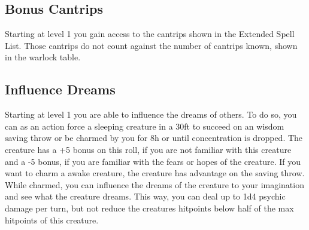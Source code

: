 \documentclass[a4paper,10pt,twoside,twocolumn]{dndbook} %
\begin{document}
	\subsection{Bonus Cantrips}
	Starting at level 1 you gain access to the cantrips shown in the Extended Spell List. Those cantrips do not count against the number of cantrips known, shown in the warlock table.
	\subsection{Influence Dreams}
	Starting at level 1 you are able to influence the dreams of others. To do so, you can as an action force a sleeping creature in a 30ft to succeed on an wisdom saving throw or be charmed by you for 8h or until concentration is dropped.
	The creature has a +5 bonus on this roll, if you are not familiar with this creature and a -5 bonus, if you are familiar with the fears or hopes of the creature. If you want to charm a awake creature, the creature has advantage on the saving throw.
	While charmed, you can influence the dreams of the creature to your imagination and see what the creature dreams. This way, you can deal up to 1d4 psychic damage per turn, but not reduce the creatures hitpoints below half of the max hitpoints of this creature.
\end{document}
